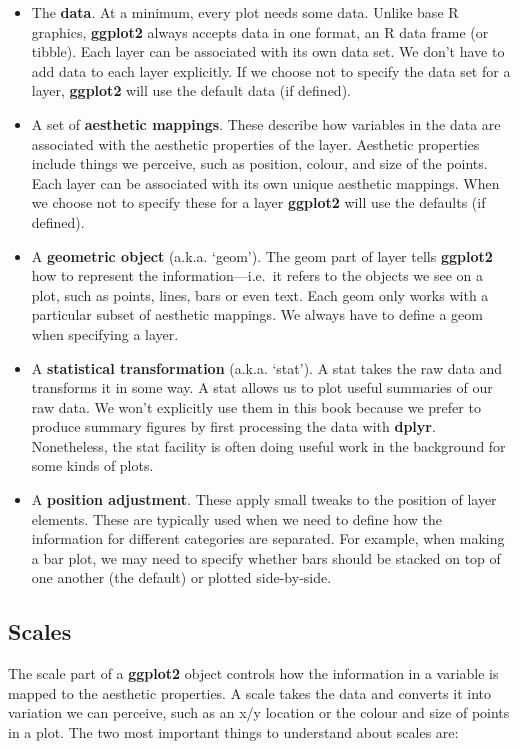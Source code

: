 \documentclass[
]{book}
\begin{document}
\begin{itemize}
\item
  The \textbf{data}. At a minimum, every plot needs some data. Unlike base R graphics, \textbf{ggplot2} always accepts data in one format, an R data frame (or tibble). Each layer can be associated with its own data set. We don't have to add data to each layer explicitly. If we choose not to specify the data set for a layer, \textbf{ggplot2} will use the default data (if defined).
\item
  A set of \textbf{aesthetic mappings}. These describe how variables in the data are associated with the aesthetic properties of the layer. Aesthetic properties include things we perceive, such as position, colour, and size of the points. Each layer can be associated with its own unique aesthetic mappings. When we choose not to specify these for a layer \textbf{ggplot2} will use the defaults (if defined).
\item
  A \textbf{geometric object} (a.k.a. `geom'). The geom part of layer tells \textbf{ggplot2} how to represent the information---i.e.~it refers to the objects we see on a plot, such as points, lines, bars or even text. Each geom only works with a particular subset of aesthetic mappings. We always have to define a geom when specifying a layer.
\item
  A \textbf{statistical transformation} (a.k.a. `stat'). A stat takes the raw data and transforms it in some way. A stat allows us to plot useful summaries of our raw data. We won't explicitly use them in this book because we prefer to produce summary figures by first processing the data with \textbf{dplyr}. Nonetheless, the stat facility is often doing useful work in the background for some kinds of plots.
\item
  A \textbf{position adjustment}. These apply small tweaks to the position of layer elements. These are typically used when we need to define how the information for different categories are separated. For example, when making a bar plot, we may need to specify whether bars should be stacked on top of one another (the default) or plotted side-by-side.
\end{itemize}

\hypertarget{scales}{%
\subsection{Scales}\label{scales}}

The scale part of a \textbf{ggplot2} object controls how the information in a variable is mapped to the aesthetic properties. A scale takes the data and converts it into variation we can perceive, such as an x/y location or the colour and size of points in a plot. The two most important things to understand about scales are:
\end{document}
